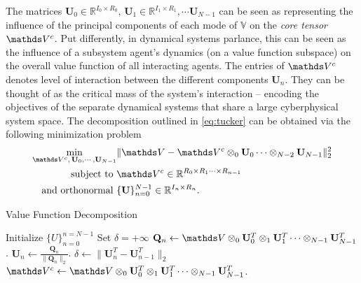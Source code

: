 %
\noindent The matrices $\mathbf{U}_0 \in \mathbb{R}^{I_0 \times R_0}, \, \mathbf{U}_1 \in \mathbb{R}^{I_1 \times R_1}, \cdots \mathbf{U}_{N-1}$ can be seen as representing the influence of the principal components of each mode of $\mathds{V}$ on the \textit{core tensor} $\valuecore$.  Put differently, in dynamical systems parlance, this can be seen as the influence of a subsystem agent's dynamics (on a value function subspace)  on the overall value function of all interacting agents. The entries of $\valuecore$ denotes level of interaction between the different components $\bm{U}_n$. They can be thought of as the critical mass of the system's interaction -- encoding the objectives of the separate dynamical systems that share a large cyberphysical system space. The decomposition outlined in \eqref{eq:tucker} can be obtained via the following minimization problem
%
\begin{align}
	\min_{\valuecore,\, \mathbf{U}_0, \cdots, \mathbf{U}_{N-1}} &\| \valuetensor
	 - \valuecore \otimes_0 \mathbf{U}_0 \cdots \otimes_{N-2} \mathbf{U}_{N-1} \|^2_2 \nonumber\\
	 \text{subject to } &\valuecore \in \bb{R}^{R_0 \times R_1 \cdots \times R_{n-1}} \nonumber \\
	\text{ and orthonormal } &\{\mathbf{U}\}_{n=0}^{N-1} \in \bb{R}^{I_n\times R_n}. 
	 \label{min:tucker_decomp}
\end{align}
%

\begin{algorithm}[tb!]
	\caption{Value Function Decomposition  
		\label{alg:tucker_power_iter}}
	\begin{algorithmic}[1]
		\State Initialize $\{U\}_{n=0}^{n=N-1}$ \label{line:left_dom_eigvec}
		\State Set $\delta = +\infty$
		\While{$\delta  > \epsilon$}
		\State $\mathbf{Q}_n \leftarrow \valuetensor \otimes_0 \mathbf{U}_0^T \otimes_1 \mathbf{U}_1^T \cdots \otimes_{N-1} \mathbf{U}_{N-1}^T$.
		\State $\mathbf{U}_n \leftarrow \frac{\mathbf{Q}_n}{\|\mathbf{Q}_n\|_2}$.
		\EndFor
		\State $\delta \leftarrow \|\mathbf{U}_n^T - \mathbf{U}_{n-1}^T\|_2$
		\EndWhile
		\State $\valuecore \leftarrow \valuetensor \otimes_0 \mathbf{U}_0^T \otimes_1 \mathbf{U}_1^T \cdots \otimes_{N-1} \mathbf{U}_{N-1}^T$. \label{tucker_decomp:line_value_core}
		\State {}
		\EndFunction
	\end{algorithmic}
\end{algorithm}

